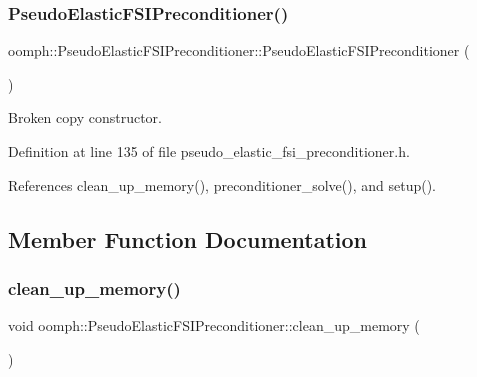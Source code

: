 \subsubsection{\texorpdfstring{Pseudo\+Elastic\+F\+S\+I\+Preconditioner()}{PseudoElasticFSIPreconditioner()}\hspace{0.1cm}{\footnotesize\ttfamily [2/2]}}
{\footnotesize\ttfamily oomph\+::\+Pseudo\+Elastic\+F\+S\+I\+Preconditioner\+::\+Pseudo\+Elastic\+F\+S\+I\+Preconditioner (\begin{DoxyParamCaption}\item[{const \hyperlink{classoomph_1_1PseudoElasticFSIPreconditioner}{Pseudo\+Elastic\+F\+S\+I\+Preconditioner} \&}]{ }\end{DoxyParamCaption})\hspace{0.3cm}{\ttfamily [inline]}}



Broken copy constructor. 



Definition at line 135 of file pseudo\+\_\+elastic\+\_\+fsi\+\_\+preconditioner.\+h.



References clean\+\_\+up\+\_\+memory(), preconditioner\+\_\+solve(), and setup().



\subsection{Member Function Documentation}
\mbox{\label{classoomph_1_1PseudoElasticFSIPreconditioner_a15859381010faa40a47fdca28b281475}} 
\subsubsection{\texorpdfstring{clean\+\_\+up\+\_\+memory()}{clean\_up\_memory()}}
{\footnotesize\ttfamily void oomph\+::\+Pseudo\+Elastic\+F\+S\+I\+Preconditioner\+::clean\+\_\+up\+\_\+memory (\begin{DoxyParamCaption}{ }\end{DoxyParamCaption})}




